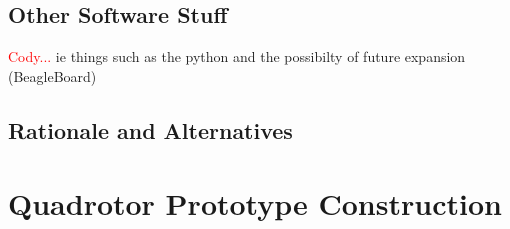 \documentclass{article}
\numberwithin{equation}{section} %
\begin{document}
\subsection{Other Software Stuff}
\textcolor{red}{Cody...} ie things such as the python and the possibilty of future expansion (BeagleBoard)

















\subsection{Rationale and Alternatives}

\section{Quadrotor Prototype Construction}

\end{document}
